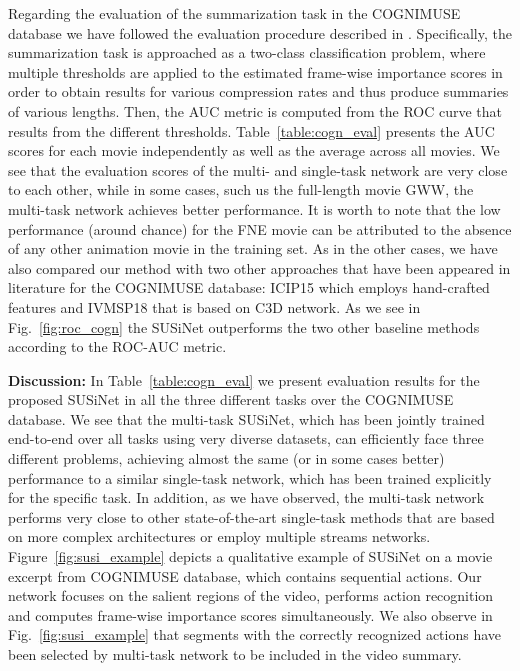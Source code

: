 \documentclass[10pt,twocolumn,letterpaper]{article}
\begin{document}
Regarding the evaluation of the summarization task in the \mbox{COGNIMUSE} database we have followed the evaluation procedure described in \cite{ZKE+_review}. Specifically, the summarization task is approached as a two-class classification problem, where multiple thresholds are applied to the estimated frame-wise importance scores in order to obtain results for various compression rates and thus produce summaries of various lengths. Then, the AUC metric is computed from the ROC curve that results from the different thresholds. Table~\ref{table:cogn_eval} presents the AUC scores for each movie independently as well as the average across all movies. We see that the evaluation scores of the multi- and single-task network are very close to each other, while in some cases, such us the full-length movie GWW, the multi-task network achieves better performance. It is worth to note that the low performance (around chance) for the FNE movie can be attributed to the absence of any other animation movie in the training set. As in the other cases, we have also compared our method with two other approaches that have been appeared in literature for the \mbox{COGNIMUSE} database: ICIP15 \cite{CVSP_ICIP2015} which employs hand-crafted features and IVMSP18 \cite{KZM18} that is based on C3D network. As we see in Fig.~\ref{fig:roc_cogn} the SUSiNet outperforms the two other baseline methods according to the ROC-AUC metric.

\noindent\textbf{Discussion:} In Table~\ref{table:cogn_eval} we present evaluation results for the proposed  SUSiNet in all the three different tasks over the \mbox{COGNIMUSE} database. We see that the multi-task SUSiNet, which has been jointly trained end-to-end over all tasks using very diverse datasets, can efficiently face three different problems, achieving almost the same (or in some cases better) performance to a similar single-task network, which has been trained explicitly for the specific task. In addition, as we have observed, the multi-task network performs very close to other state-of-the-art single-task methods that are based on more complex architectures or employ multiple streams networks. Figure~\ref{fig:susi_example} depicts a  qualitative example of SUSiNet on a movie excerpt from \mbox{COGNIMUSE} database, which contains sequential actions. Our network focuses on the salient regions of the video, performs action recognition and computes frame-wise importance scores simultaneously. We also observe in Fig.~\ref{fig:susi_example} that segments with the correctly recognized actions have been selected by multi-task network to be included in the video summary.     
\end{document}
